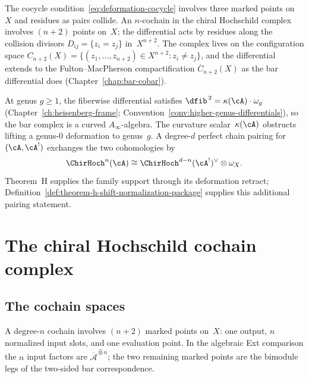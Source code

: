 The cocycle condition~\eqref{eq:deformation-cocycle} involves three
marked points on~$X$ and residues as pairs collide. An $n$-cochain
in the chiral Hochschild complex involves $(n+2)$ points on~$X$;
the differential acts by residues along the collision divisors
$D_{ij}=\{z_i=z_j\}$ in~$X^{n+2}$. The complex lives on the
configuration space
$C_{n+2}(X)=\{(z_1,\ldots,z_{n+2})\in X^{n+2}: z_i\neq z_j\}$,
and the differential extends to the Fulton--MacPherson
compactification $\overline{C}_{n+2}(X)$ as the bar
differential does (Chapter~\ref{chap:bar-cobar}).

At genus $g\geq 1$, the fiberwise differential satisfies
$\dfib^{\,2}=\kappa(\cA)\cdot\omega_g$
(Chapter~\ref{ch:heisenberg-frame};
Convention~\ref{conv:higher-genus-differentials}), so the bar complex
is a curved $A_\infty$-algebra. The curvature scalar~$\kappa(\cA)$
obstructs lifting a genus-$0$ deformation to genus~$g$.
A degree-\(d\) perfect chain pairing for \((\cA,\cA^!)\) exchanges
the two cohomologies by
\[
 \ChirHoch^n(\cA)
 \cong\ChirHoch^{d-n}(\cA^!)^\vee\otimes\omega_X.
\]
Theorem~H supplies the family support through its deformation
retract; Definition~\ref{def:theorem-h-shift-normalization-package}
supplies this additional pairing statement.

\section{The chiral Hochschild cochain complex}

\subsection{The cochain spaces}

A degree-$n$ cochain involves $(n+2)$ marked points on~$X$: one output,
$n$ normalized input slots, and one evaluation point.  In the algebraic
Ext comparison the $n$ input factors are
$\overline{\mathcal A}^{\widehat\otimes n}$; the two remaining marked
points are the bimodule legs of the two-sided bar correspondence.

